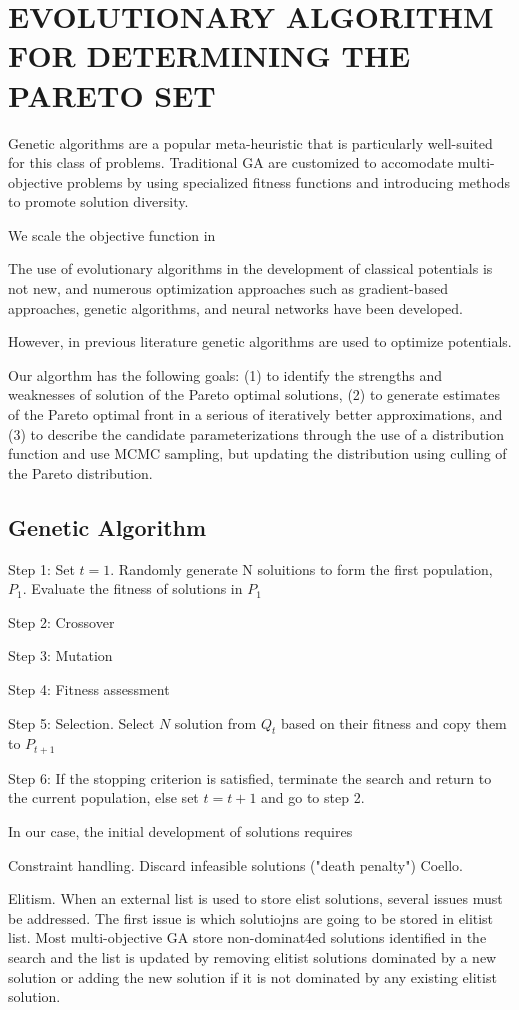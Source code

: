 \chapter{EVOLUTIONARY ALGORITHM FOR DETERMINING THE PARETO SET}

Genetic algorithms are a popular meta-heuristic that is particularly well-suited for this class of problems.  Traditional GA are customized to accomodate multi-objective problems by using specialized fitness functions and introducing methods to promote solution diversity.

We scale the objective function in

The use of evolutionary algorithms in the development of classical potentials is not new, and numerous optimization approaches such as gradient-based approaches, genetic algorithms, and neural networks have been developed.

However, in previous literature genetic algorithms are used to optimize potentials.

Our algorthm has the following goals: (1) to identify the strengths and weaknesses of solution of the Pareto optimal solutions, (2) to generate estimates of the Pareto optimal front in a serious of iteratively better approximations, and (3) to describe the candidate parameterizations through the use of a distribution function and use MCMC sampling, but updating the distribution using culling of the Pareto distribution.

\section{Genetic Algorithm}

Step 1: Set $t=1$.  Randomly generate N soluitions to form the first population, $P_1$.  Evaluate the fitness of solutions in $P_1$

Step 2: Crossover

Step 3: Mutation

Step 4: Fitness assessment

Step 5: Selection.  Select $N$ solution from $Q_t$ based on their fitness and copy them to $P_{t+1}$

Step 6: If the stopping criterion is satisfied, terminate the search and return to the current population, else set $t=t+1$ and go to step 2.

In our case, the initial development of solutions requires

Constraint handling.  Discard infeasible solutions ("death penalty") Coello.

Elitism.  When an external list is used to store elist solutions, several issues must be addressed.  The first issue is which solutiojns are going to be stored in elitist list.  Most multi-objective GA store non-dominat4ed solutions identified in the search and the list is updated by removing elitist solutions dominated by a new solution or adding the new solution if it is not dominated by any existing elitist solution.
